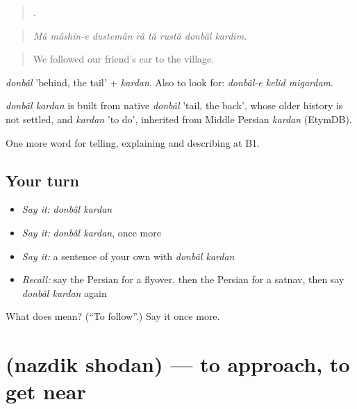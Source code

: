 \begin{quote}
       .
\end{quote}

\begin{quote}
\emph{Mâ mâshin-e dustemân râ tâ rustâ donbâl kardim.}
\end{quote}

\begin{quote}
We followed our friend's car to the village.
\end{quote}

\emph{donbâl} 'behind, the tail' + \emph{kardan}. Also to look for: \emph{donbâl-e kelid migardam}.

\begin{cousinweb}
\emph{donbâl kardan} is built from native \emph{donbâl} 'tail, the back', whose older history is not settled, and \emph{kardan} 'to do', inherited from Middle Persian \emph{kardan} (EtymDB).
\end{cousinweb}

\begin{grammarlens}[title={What you've built}]
One more word for telling, explaining and describing at B1.
\end{grammarlens}

\subsection*{Your turn}
\begin{itemize}
\raggedright
  \item \emph{Say it:} \emph{donbâl kardan}
  \item \emph{Say it:} \emph{donbâl kardan}, once more
  \item \emph{Say it:} a sentence of your own with \emph{donbâl kardan}
  \item \emph{Recall:} say the Persian for a flyover, then the Persian for a satnav, then say \emph{donbâl kardan} again
\end{itemize}

\begin{tcolorbox}[breakable,colback=teal!4,colframe=teal!35!black,title={Before you move on}]
What does   mean? (\textquotedblleft{}To follow\textquotedblright{}.) Say it once more.
\end{tcolorbox}
\section[\texorpdfstring{\fa{نزدیک} \fa{شدن} (nazdik shodan)}{نزدیک شدن (nazdik shodan)}]{  (nazdik shodan) — to approach, to get near}

